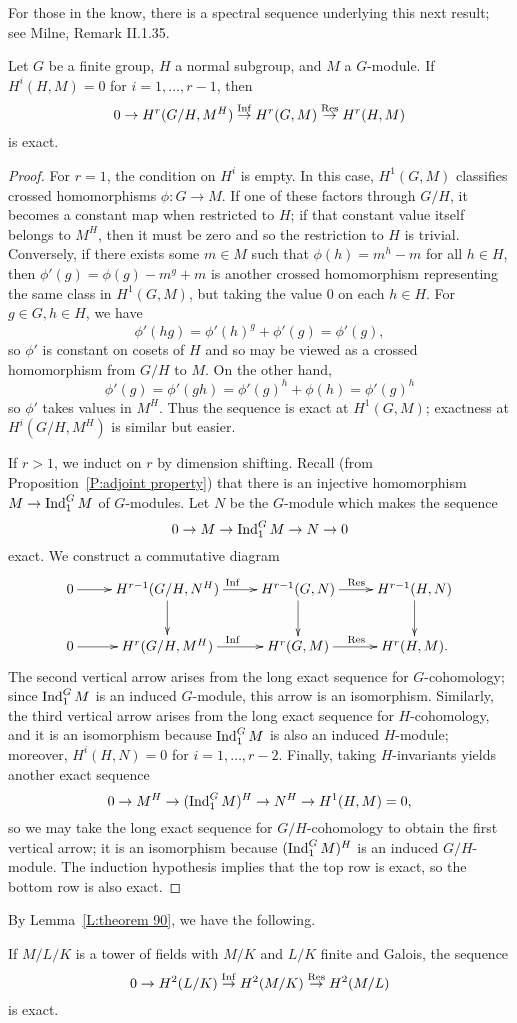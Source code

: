 For those in the know, there is a spectral sequence underlying this next
result; see Milne, Remark II.1.35.
\begin{prop} \label{P:inflation restriction}
Let $G$ be a finite group, $H$ a normal subgroup, and $M$ a $G$-module.
If $H^i(H, M) = 0$ for $i=1, \dots, r-1$, then 
\[
0 \to H^r(G/H, M^H) \stackrel{\operatorname{Inf}}{\to} H^r(G,M) \stackrel{\operatorname{Res}}{\to}
H^r(H,M)
\]
is exact.
\end{prop}
\begin{proof}
For $r=1$, the condition on $H^i$ is empty. In this case, $H^1(G,M)$
classifies crossed homomorphisms $\phi:G \to M$. If one of these
factors through $G/H$, it becomes a constant map when restricted to $H$;
if that constant value itself belongs to $M^H$, then it must be zero
and so the restriction to $H$ is trivial.
Conversely, if there exists some $m \in M$ such that 
$\phi(h) = m^h - m$ for all $h \in H$, then
$\phi'(g) = \phi(g) - m^g + m$ is another crossed homomorphism representing the same class in $H^1(G,M)$, but taking the value 0 on each $h \in H$. For $g \in G, h \in H$, we have
\[
\phi'(hg) = \phi'(h)^g + \phi'(g) = \phi'(g),
\]
so $\phi'$ is constant on cosets of $H$ and so may be viewed as a crossed homomorphism from $G/H$ to $M$. On the other hand,
\[
\phi'(g) = \phi'(gh) = \phi'(g)^h + \phi(h) = \phi'(g)^h
\]
so $\phi'$ takes values in $M^H$.
 Thus the sequence is exact at $H^1(G,M)$; exactness at
$H^i(G/H,M^H)$ is similar but easier.

If $r>1$, we induct on $r$ by dimension shifting. 
Recall (from Proposition~\ref{P:adjoint property}) that there is an injective homomorphism $M \to \operatorname{Ind}^G_1 M$ of $G$-modules.
Let $N$ be the $G$-module
which makes the sequence
\[
0 \to M \to \operatorname{Ind}^G_{1} M \to N \to 0
\]
exact. We construct a commutative diagram
\[
\xymatrix{
0 \ar[r] & H^{r-1}(G/H, N^H) \ar^{\Inf}[r] \ar[d] & H^{r-1}(G, N) \ar^{\Res}[r] \ar[d] & 
H^{r-1}(H,N) \ar[d] \\
0 \ar[r] & H^{r}(G/H, M^H) \ar^{\Inf}[r] & H^{r}(G, M) \ar^{\Res}[r] & 
H^{r}(H,M).
}
\]
The second vertical arrow arises from the long exact sequence for $G$-cohomology;
since $\operatorname{Ind}^G_{1} M$ is an induced $G$-module, this arrow is an isomorphism.
Similarly, the third vertical arrow arises from the long exact sequence for $H$-cohomology,
and it is an isomorphism because $\operatorname{Ind}^G_1 M$ is also an induced $H$-module; moreover, $H^i(H, N) = 0$ for $i=1, \dots, r-2$. 
Finally, taking $H$-invariants yields another exact sequence
\[
0 \to M^H \to (\operatorname{Ind}^G_1 M)^H \to N^H \to H^1(H, M) = 0,
\]
so we may take the long exact sequence for $G/H$-cohomology to obtain the first vertical arrow; it is an isomorphism because $(\operatorname{Ind}^G_1 M)^H$ is an induced $G/H$-module. The induction hypothesis implies that the top row is exact, so the bottom row is also exact.
\end{proof}
By Lemma~\ref{L:theorem 90}, we have the following.
\begin{cor} \label{C:inflation restriction h2}
If $M/L/K$ is a tower of fields with $M/K$ and $L/K$ finite and Galois,
the sequence
\[
0 \to H^2(L/K) \stackrel{\operatorname{Inf}}{\to} H^2(M/K) \stackrel{\operatorname{Res}}{\to} H^2(M/L)
\]
is exact.
\end{cor}

